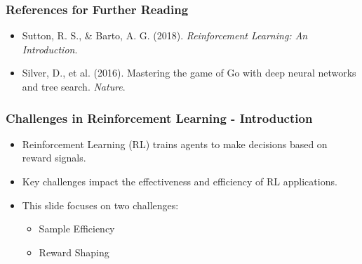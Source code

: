 \documentclass[aspectratio=169]{beamer}
\begin{document}
\begin{frame}[fragile]
    \frametitle{References for Further Reading}
    \begin{itemize}
        \item Sutton, R. S., \& Barto, A. G. (2018). \textit{Reinforcement Learning: An Introduction}.
        \item Silver, D., et al. (2016). Mastering the game of Go with deep neural networks and tree search. \textit{Nature}.
    \end{itemize}
\end{frame}

\begin{frame}[fragile]
    \frametitle{Challenges in Reinforcement Learning - Introduction}
    \begin{itemize}
        \item Reinforcement Learning (RL) trains agents to make decisions based on reward signals.
        \item Key challenges impact the effectiveness and efficiency of RL applications.
        \item This slide focuses on two challenges: 
        \begin{itemize}
            \item Sample Efficiency
            \item Reward Shaping
        \end{itemize}
    \end{itemize}
\end{frame}
\end{document}
